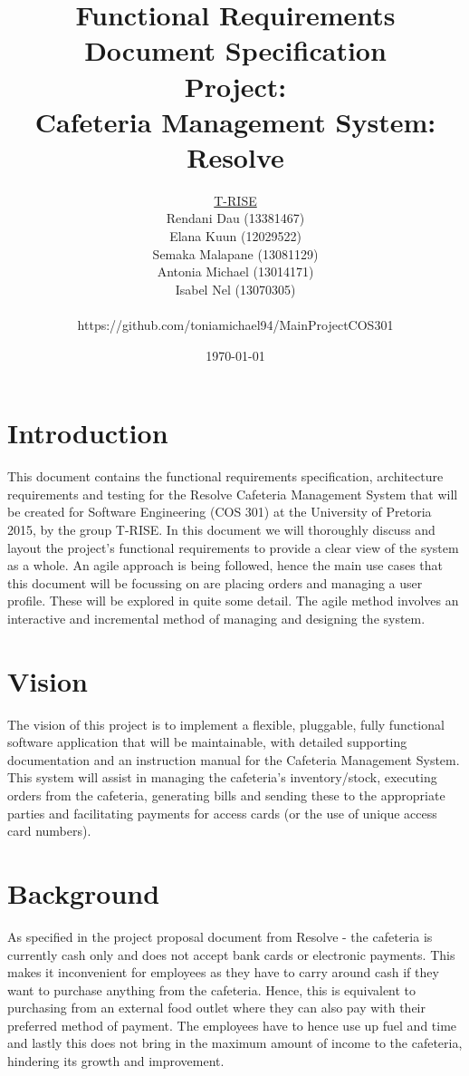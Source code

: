 \documentclass[a4paper,12pt]{article}
\title{\Huge Functional Requirements Document Specification \\ 
	 Project: \\ 
	Cafeteria Management System: Resolve}
\author{
         \underline{T-RISE}\\
          Rendani Dau (13381467) \\
	Elana Kuun (12029522) \\
	Semaka Malapane (13081129) \\
	Antonia Michael (13014171) \\
	Isabel Nel (13070305)\\ \\
	https://github.com/toniamichael94/MainProjectCOS301}
\date{\today}
\begin{document}
\maketitle
\break

\tableofcontents
\break


\section{Introduction}
This document contains the functional requirements specification, architecture requirements and testing for the Resolve Cafeteria Management System that will be created for Software Engineering (COS 301) at the University of Pretoria 2015, by the group T-RISE. In this document we will thoroughly discuss and layout the project's functional requirements to provide a clear view of the system as a whole. An agile approach is being followed, hence the main use cases that this document will be focussing on are placing orders and managing a user profile. These will be explored in quite some detail.  The agile method involves an interactive and incremental method of managing and designing the system. 
\section{Vision}
The vision of this project is to implement a flexible, pluggable, fully functional software application that will be maintainable, with detailed supporting documentation and an instruction manual for the Cafeteria Management System. This system will assist in managing the cafeteria's inventory/stock, executing orders from the cafeteria, generating bills and sending these to the appropriate parties and facilitating payments for access cards (or the use of unique access card numbers). 

\section{Background}
As specified in the project proposal document from Resolve - the cafeteria is currently cash only and does not accept bank cards or electronic payments. This makes it inconvenient for employees as they have to carry around cash if they want to purchase anything from the cafeteria. Hence, this is equivalent to purchasing from an external food outlet where they can also pay with their preferred method of payment. The employees have to hence use up fuel and time and lastly this does not bring in the maximum amount of income to the cafeteria, hindering its growth and improvement.\\
\end{document}
